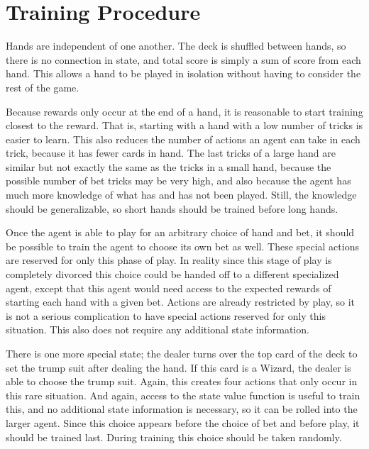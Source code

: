 \documentclass[10pt]{article} %
\begin{document}
\section{Training Procedure}

Hands are independent of one another. The deck is shuffled between hands, so there is no connection in state, and total score is simply a sum of score from each hand. This allows a hand to be played in isolation without having to consider the rest of the game.

Because rewards only occur at the end of a hand, it is reasonable to start training closest to the reward. That is, starting with a hand with a low number of tricks is easier to learn. This also reduces the number of actions an agent can take in each trick, because it has fewer cards in hand. The last tricks of a large hand are similar but not exactly the same as the tricks in a small hand, because the possible number of bet tricks may be very high, and also because the agent has much more knowledge of what has and has not been played. Still, the knowledge should be generalizable, so short hands should be trained before long hands.

Once the agent is able to play for an arbitrary choice of hand and bet, it should be possible to train the agent to choose its own bet as well. These special actions are reserved for only this phase of play. In reality since this stage of play is completely divorced this choice could be handed off to a different specialized agent, except that this agent would need access to the expected rewards of starting each hand with a given bet. Actions are already restricted by play, so it is not a serious complication to have special actions reserved for only this situation. This also does not require any additional state information.

There is one more special state; the dealer turns over the top card of the deck to set the trump suit after dealing the hand. If this card is a Wizard, the dealer is able to choose the trump suit. Again, this creates four actions that only occur in this rare situation. And again, access to the state value function is useful to train this, and no additional state information is necessary, so it can be rolled into the larger agent. Since this choice appears before the choice of bet and before play, it should be trained last. During training this choice should be taken randomly.
\end{document}

